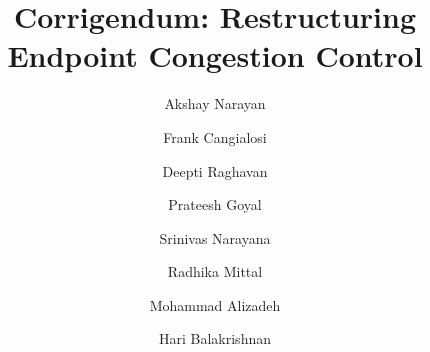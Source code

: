 \documentclass[format=acmlarge,10pt,screen,nonacm,natbib=false]{acmart}
\begin{document}

\title{Corrigendum: Restructuring Endpoint Congestion Control}
\author{Akshay Narayan}
\author{Frank Cangialosi}
\author{Deepti Raghavan}
\author{Prateesh Goyal}
\author{Srinivas Narayana}
\author{Radhika Mittal} 
\author{Mohammad Alizadeh}
\author{Hari Balakrishnan}
\newcommand*{\origrightarrow}{$\rightarrow$}
\let\oldarrow\textrightarrow
\renewcommand*{\textrightarrow}{\fontfamily{cmr}\selectfont\origrightarrow}
\renewcommand{\shortauthors}{Akshay Narayan, Frank Cangialosi, Deepti Raghavan, et al.}
\acmPrice{}
\acmDOI{}
\makeatletter
\let\@authorsaddresses\@empty
\makeatother
\renewcommand\footnotetextcopyrightpermission[1]{} %
\pagestyle{plain} %
\fancyfoot{}
\maketitle
\thispagestyle{empty}
\end{document}
